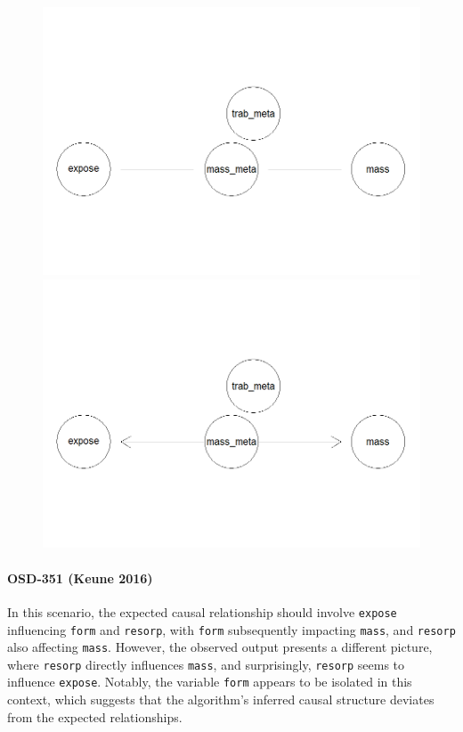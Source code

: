\documentclass{article}
\begin{document}
\begin{figure}[h] %
    \begin{minipage}{0.45\textwidth}
        \centering
        \includegraphics[width=\linewidth]{meta.png}
    \end{minipage}
    \hfill
    \begin{minipage}{0.45\textwidth}
        \centering
        \includegraphics[width=\linewidth]{c_meta.png}
    \end{minipage}
\end{figure}


\paragraph{OSD-351 (Keune 2016)}
In this scenario, the expected causal relationship should involve \texttt{expose} influencing \texttt{form} and \texttt{resorp}, with \texttt{form} subsequently impacting \texttt{mass}, and \texttt{resorp} also affecting \texttt{mass}. However, the observed output presents a different picture, where \texttt{resorp} directly influences \texttt{mass}, and surprisingly, \texttt{resorp} seems to influence \texttt{expose}. Notably, the variable \texttt{form} appears to be isolated in this context, which suggests that the algorithm's inferred causal structure deviates from the expected relationships.
\end{document}
